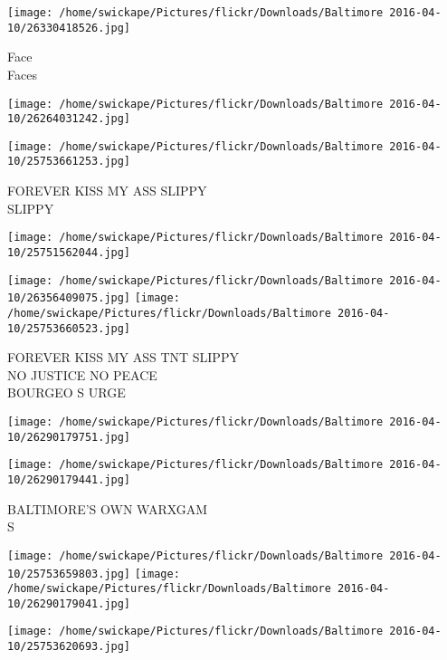 \documentclass[10pt,letterpaper]{article}
\begin{document}
\vspace{0.25in}
\texttt{[image: /home/swickape/Pictures/flickr/Downloads/Baltimore 2016-04-10/26330418526.jpg]}

Face\\
Faces\\
\pagebreak

\texttt{[image: /home/swickape/Pictures/flickr/Downloads/Baltimore 2016-04-10/26264031242.jpg]}

\vspace{0.25in}
\texttt{[image: /home/swickape/Pictures/flickr/Downloads/Baltimore 2016-04-10/25753661253.jpg]}

FOREVER KISS MY ASS SLIPPY\\
SLIPPY\\
\pagebreak

\texttt{[image: /home/swickape/Pictures/flickr/Downloads/Baltimore 2016-04-10/25751562044.jpg]}

\vspace{0.25in}
\texttt{[image: /home/swickape/Pictures/flickr/Downloads/Baltimore 2016-04-10/26356409075.jpg]}
\texttt{[image: /home/swickape/Pictures/flickr/Downloads/Baltimore 2016-04-10/25753660523.jpg]}

FOREVER KISS MY ASS TNT SLIPPY\\
NO JUSTICE NO PEACE\\
BOURGEO S URGE\\
\pagebreak

\texttt{[image: /home/swickape/Pictures/flickr/Downloads/Baltimore 2016-04-10/26290179751.jpg]}

\vspace{0.25in}
\texttt{[image: /home/swickape/Pictures/flickr/Downloads/Baltimore 2016-04-10/26290179441.jpg]}

BALTIMORE'S OWN WARXGAM\\
S\\
\pagebreak

\texttt{[image: /home/swickape/Pictures/flickr/Downloads/Baltimore 2016-04-10/25753659803.jpg]}
\texttt{[image: /home/swickape/Pictures/flickr/Downloads/Baltimore 2016-04-10/26290179041.jpg]}

\vspace{0.25in}
\texttt{[image: /home/swickape/Pictures/flickr/Downloads/Baltimore 2016-04-10/25753620693.jpg]}
\end{document}
